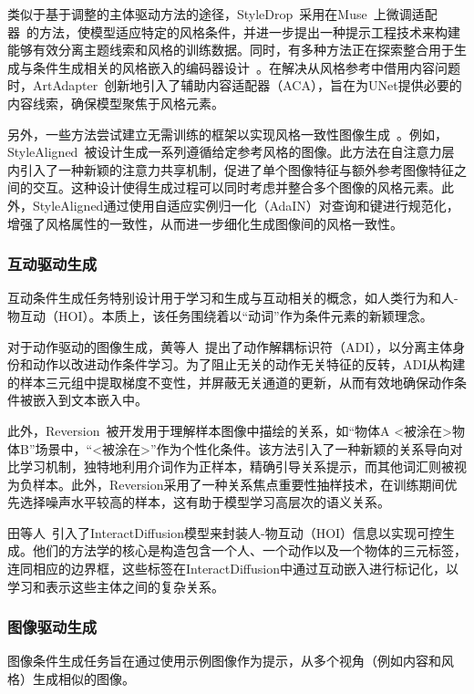 类似于基于调整的主体驱动方法的途径，StyleDrop~\cite{sohn2023styledrop}采用在Muse~\cite{szegedy2017inception}上微调适配器~\cite{houlsby2019parameter, sohn2023visual}的方法，使模型适应特定的风格条件，并进一步提出一种提示工程技术来构建能够有效分离主题线索和风格的训练数据。同时，有多种方法正在探索整合用于生成与条件生成相关的风格嵌入的编码器设计~\cite{liu2023stylecrafter,chen2023artadapter}。在解决从风格参考中借用内容问题时，ArtAdapter~\cite{chen2023artadapter}创新地引入了辅助内容适配器（ACA），旨在为UNet提供必要的内容线索，确保模型聚焦于风格元素。

另外，一些方法尝试建立无需训练的框架以实现风格一致性图像生成~\cite{hertz2023style,pan2023towards}。例如，StyleAligned~\cite{hertz2023style}被设计生成一系列遵循给定参考风格的图像。此方法在自注意力层内引入了一种新颖的注意力共享机制，促进了单个图像特征与额外参考图像特征之间的交互。这种设计使得生成过程可以同时考虑并整合多个图像的风格元素。此外，StyleAligned通过使用自适应实例归一化（AdaIN）\cite{huang2017arbitrary}对查询和键进行规范化，增强了风格属性的一致性，从而进一步细化生成图像间的风格一致性。

\subsubsection{互动驱动生成}
互动条件生成任务特别设计用于学习和生成与互动相关的概念，如人类行为和人-物互动（HOI）。本质上，该任务围绕着以“动词”作为条件元素的新颖理念。

对于动作驱动的图像生成，黄等人~\cite{huang2023learning}提出了动作解耦标识符（ADI），以分离主体身份和动作以改进动作条件学习。为了阻止无关的动作无关特征的反转，ADI从构建的样本三元组中提取梯度不变性，并屏蔽无关通道的更新，从而有效地确保动作条件被嵌入到文本嵌入中。

此外，Reversion~\cite{huang2023reversion}被开发用于理解样本图像中描绘的关系，如“物体A \textless 被涂在\textgreater 物体B”场景中，“\textless 被涂在\textgreater”作为个性化条件。该方法引入了一种新颖的关系导向对比学习机制，独特地利用介词作为正样本，精确引导关系提示，而其他词汇则被视为负样本。此外，Reversion采用了一种关系焦点重要性抽样技术，在训练期间优先选择噪声水平较高的样本，这有助于模型学习高层次的语义关系。

田等人~\cite{tian2023interactdiffusion}引入了InteractDiffusion模型来封装人-物互动（HOI）信息以实现可控生成。他们的方法学的核心是构造包含一个人、一个动作以及一个物体的三元标签，连同相应的边界框，这些标签在InteractDiffusion中通过互动嵌入进行标记化，以学习和表示这些主体之间的复杂关系。

\subsubsection{图像驱动生成}
图像条件生成任务旨在通过使用示例图像作为提示，从多个视角（例如内容和风格）生成相似的图像。

